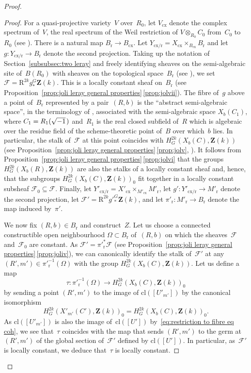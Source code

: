 \documentclass[JEP,XML,SOM,Unicode]{cedram}
\theoremstyle{plain}
\theoremstyle{definition}
\numberwithin{equation}{section}
\newcommand{\cl}{{\mathrm{cl}}}
\newcommand{\cx}{{\mathrm{cx}}}
\newcommand{\rs}{{\mathrm{r}}}
\newcommand{\sF}{{\mathscr F}}
\newcommand{\Z}{{\mathbf Z}}
\newcommand{\RR}{{\mathrm{R}}}
\begin{document}
\begin{proof}
\begin{proof}
For a quasi-projective variety~$V$ over~$R_0$, let $V_\cx$ denote the complex
spectrum of~$V$, \ie the real spectrum of the Weil restriction
of $V \otimes_{R_0}C_0$ from~$C_0$ to~$R_0$
(see \cite[(0.4) and Def.\,5.6.2]{scheiderer}).
There is a natural map $B_\rs \to B_\cx$.
Let $Y_{\cx/\rs} = X_\cx \times_{B_\cx} B_\rs$
and let $g:Y_{\cx/\rs}\to B_\rs$ denote the second projection.
Taking up the notation of Section~\ref{subsubsec:two leray}
and freely identifying sheaves on the semi-algebraic site of~$B(R_0)$ with
sheaves on the topological space~$B_\rs$ (see \cite[Ch.\,I, Prop.\,1.4]{delfshomology}),
we set $\sF=\RR^{2k}g^G_*\Z(k)$.
This is a locally constant sheaf on~$B_\rs$
(see Proposition~\ref{prop:joli leray general properties}\,\eqref{prop:jolvii}).
The fibre of~$g$ above a point of~$B_\rs$ represented by a pair~$(R,b)$ is the ``abstract semi-algebraic space'',
in the terminology of \cite[App.\,A to Ch.\,I]{delfsknebuschbook},
associated with the semi-algebraic space $X_b(C_1)$, where $C_1=R_1(\sqrt{-1}\mkern2mu)$
and~$R_1$ is the real closed subfield of~$R$ which is algebraic over
the residue field of the scheme-theoretic point of~$B$
over which~$b$ lies.
In particular, the stalk of~$\sF$ at this point coincides with $H^{2k}_G(X_b(C),\Z(k))$
(see Proposition~\ref{prop:joli leray general properties}\,\eqref{prop:jolv},
\cite[Ch.\,I, Cor.\,1.5 \& Ch.\,II, Th.\,6.1]{delfshomology}).
It follows from Proposition~\ref{prop:joli leray general properties}\,\eqref{prop:jolvi}
that the groups $H^{2k}_G(X_b(R),\Z(k))$ are also the stalks of a locally constant
sheaf and, hence, that the subgroups $H^{2k}_G(X_b(C),\Z(k))_0$
fit together in a locally constant subsheaf $\sF_0 \subseteq \sF$.
Finally,
let $Y'_{\cx/\rs}=X'_\cx\times_{M'_\cx}M'_\rs$,
let $g':Y'_{\cx/\rs}\to M'_\rs$ denote the second projection,
let $\sF'=\RR^{2k}g'^G_*\Z(k)$,
and let $\pi'_\rs:M'_\rs\to B_\rs$ denote the map induced by~$\pi'$.

We now fix $(R,b) \in B_\rs$ and construct~$Z$.
Let us choose a connected constructible open neighbourhood
$\Omega \subset B_\rs$ of~$(R,b)$
on which the sheaves~$\sF$ and~$\sF_0$ are constant.
As $\sF'=\pi'^*_\rs\sF$
(see Proposition~\ref{prop:joli leray general properties}\,\eqref{prop:joliv}),
we can canonically identify the stalk of~$\sF'$ at any $(R',m') \in \pi'^{-1}_\rs(\Omega)$
with the group $H^{2k}_G(X_b(C),\Z(k))$.
Let us define a map
\begin{equation}
\label{eq:locally constant map hilbert}
\tau:\pi'^{-1}_\rs(\Omega) \to H^{2k}_G(X_b(C),\Z(k))_0
\end{equation}
by sending a point $(R',m')$ to the image
of $\cl([U'_{m'}])$
by the
canonical isomorphism
\[
H^{2k}_G(X'_{m'}(C'),\Z(k))_0=H^{2k}_G(X_b(C),\Z(k))_0.
\]
As $\cl([U'_{m'}])$
is also the image of~$\cl([U'])$
by~\eqref{eq:restriction to fibre eq coh},
we see that~$\tau$
coincides with the map that
sends $(R',m')$ to the germ at $(R',m')$ of the global section
of~$\sF'$ defined by $\cl([U'])$.
In particular, as~$\sF'$ is locally constant,
we deduce that~$\tau$ is locally constant.


\end{proof}
\end{proof}
\end{document}
